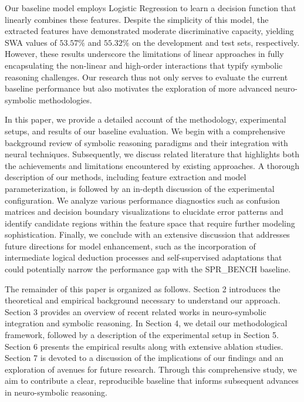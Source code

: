 \documentclass{article}
\begin{document}
Our baseline model employs Logistic Regression to learn a decision function that linearly combines these features. Despite the simplicity of this model, the extracted features have demonstrated moderate discriminative capacity, yielding SWA values of \(53.57\%\) and \(55.32\%\) on the development and test sets, respectively. However, these results underscore the limitations of linear approaches in fully encapsulating the non-linear and high-order interactions that typify symbolic reasoning challenges. Our research thus not only serves to evaluate the current baseline performance but also motivates the exploration of more advanced neuro-symbolic methodologies.

In this paper, we provide a detailed account of the methodology, experimental setups, and results of our baseline evaluation. We begin with a comprehensive background review of symbolic reasoning paradigms and their integration with neural techniques. Subsequently, we discuss related literature that highlights both the achievements and limitations encountered by existing approaches. A thorough description of our methods, including feature extraction and model parameterization, is followed by an in-depth discussion of the experimental configuration. We analyze various performance diagnostics such as confusion matrices and decision boundary visualizations to elucidate error patterns and identify candidate regions within the feature space that require further modeling sophistication. Finally, we conclude with an extensive discussion that addresses future directions for model enhancement, such as the incorporation of intermediate logical deduction processes and self-supervised adaptations that could potentially narrow the performance gap with the SPR\_BENCH baseline.

The remainder of this paper is organized as follows. Section 2 introduces the theoretical and empirical background necessary to understand our approach. Section 3 provides an overview of recent related works in neuro-symbolic integration and symbolic reasoning. In Section 4, we detail our methodological framework, followed by a description of the experimental setup in Section 5. Section 6 presents the empirical results along with extensive ablation studies. Section 7 is devoted to a discussion of the implications of our findings and an exploration of avenues for future research. Through this comprehensive study, we aim to contribute a clear, reproducible baseline that informs subsequent advances in neuro-symbolic reasoning.
\end{document}
